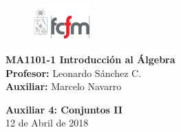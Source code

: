 \documentclass[letterpaper,11pt]{article}
\theoremstyle{plain}
\begin{document}
\newpage
\pagestyle{fancy}
\fancyhf{}

\begin{figure} %
    \vspace{-5mm}
    \includegraphics[width=0.2\textwidth]{img/fcfm2.png}
\end{figure}


\noindent
\textbf{MA1101-1 Introducción al Álgebra}\\
\textbf{Profesor: }Leonardo Sánchez C.\\
\textbf{Auxiliar: }Marcelo Navarro

\begin{center}
{\bf \Large Auxiliar 4: Conjuntos II}\\
{12 de Abril de 2018}
\end{center}
\end{document}
